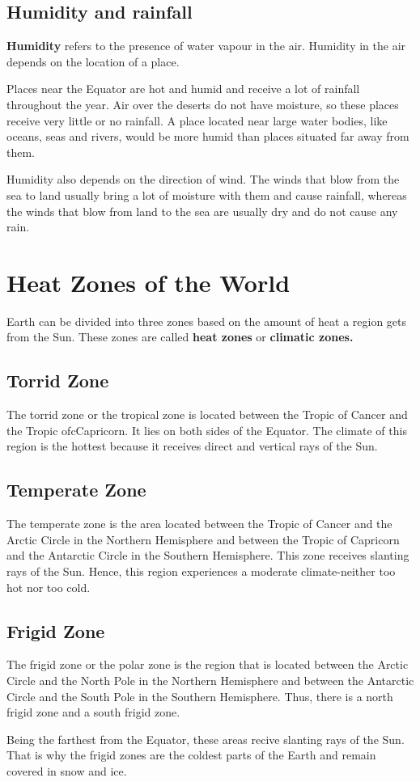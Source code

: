 \subsection{\textbf{Humidity and rainfall}}
\textbf{Humidity} refers to the presence of water vapour in the air. Humidity in the air depends on the location of a place.
\vspace{0.1in}
\par
Places near the Equator are hot and humid and receive a lot of rainfall throughout the year. Air over the deserts do not have moisture, so these places receive very little or no rainfall. A place located near large water bodies, like oceans, seas and rivers, would be more humid than places situated far away from them.
\vspace{0.4in}
\par
Humidity also depends on the direction of wind. The winds that blow from the sea to land usually bring a lot of moisture with them and cause rainfall, whereas the winds that blow from land to the sea are usually dry and do not cause any rain.
\section{Heat Zones of the World}
Earth can be divided into three zones based on the amount of heat a region gets from the Sun. These zones are called \textbf{heat zones} or \textbf{climatic zones.}
\subsection{Torrid Zone}
The torrid zone or the tropical zone is located between the Tropic of Cancer and the Tropic ofcCapricorn. It lies on both sides of the Equator. The climate of this region is the hottest because it receives direct and vertical rays of the Sun.
\subsection{Temperate Zone}
The temperate zone is the area located between the Tropic of Cancer and the Arctic Circle in the Northern Hemisphere and between the Tropic of Capricorn and the Antarctic Circle in the Southern Hemisphere. This zone receives slanting rays of the Sun. Hence, this region experiences a moderate climate-neither too hot nor too cold.
\subsection{Frigid Zone}
The frigid zone or the polar zone is the region that is located between the Arctic Circle and the North Pole in the Northern Hemisphere and between the Antarctic Circle and the South Pole in the Southern Hemisphere. Thus, there is a north frigid zone and a south frigid zone.
\vspace{0.4in}
\par
Being the farthest from the Equator, these areas recive slanting rays of the Sun. That is why the frigid zones are the coldest parts of the Earth and remain covered in snow and ice.

